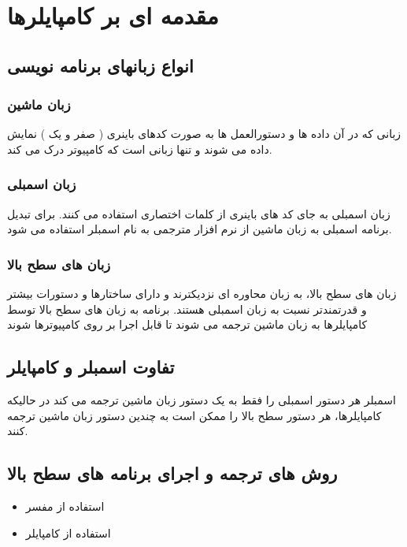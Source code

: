 \documentclass{book}
\begin{document}
\chapter{مقدمه ای بر کامپایلرها}

\section{انواع زبانهای برنامه نویسی}

\subsection{زبان ماشین}

زبانی که در آن داده ها و دستورالعمل ها به صورت کدهای باینری ( صفر و یک ) نمایش داده می شوند و تنها زبانی است که کامپیوتر درک می کند.

\subsection{زبان اسمبلی}
زبان اسمبلی به جای کد های باینری از کلمات اختصاری استفاده می کنند. برای تبدیل برنامه اسمبلی به زبان ماشین از نرم افزار مترجمی به نام اسمبلر استفاده می شود.

\subsection{زبان های سطح بالا}
زبان های سطح بالا، به زبان محاوره ای نزدیکترند و دارای ساختارها و دستورات بیشتر و قدرتمندتر نسبت به زبان اسمبلی هستند. برنامه به زبان های سطح بالا توسط کامپایلرها به زبان ماشین ترجمه می شوند تا قابل اجرا بر روی کامپیوترها شوند

\section{تفاوت اسمبلر و کامپایلر}
اسمبلر هر دستور اسمبلی را فقط به یک دستور زبان ماشین ترجمه می کند در حالیکه کامپایلرها، هر دستور سطح بالا را ممکن است به چندین دستور زبان ماشین ترجمه کنند.


\section{روش های ترجمه و اجرای برنامه های سطح بالا}

\begin{itemize}
	\item استفاده از مفسر
	\item استفاده از کامپایلر
\end{itemize}
\end{document}
